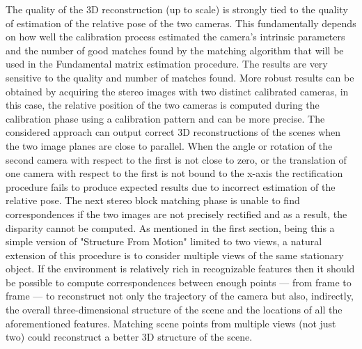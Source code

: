 \documentclass[12pt]{amsart}
\begin{document}
The quality of the 3D reconstruction (up to scale) is strongly tied to the quality of estimation of the relative pose of the two cameras.
This fundamentally depends on how well the calibration process estimated the camera's intrinsic parameters and the number of good matches found by the matching algorithm
that will be used in the Fundamental matrix estimation procedure. The results are very sensitive to the quality and number of matches found.
More robust results can be obtained by acquiring the stereo images with two distinct calibrated cameras, in this case, the relative position of the two cameras is
computed during the calibration phase using a calibration pattern and can be more precise.
The considered approach can output correct 3D reconstructions of the scenes when the two image planes are close to parallel. 
When the angle or rotation of the second camera with respect to the first is not close to zero,
or the translation of one camera with respect to the first is not bound to the x-axis the rectification procedure fails to produce expected results
due to incorrect estimation of the relative pose. The next stereo block matching phase is unable to find correspondences if the two
images are not precisely rectified and as a result, the disparity cannot be computed.
As mentioned in the first section, being this a simple version of "Structure From Motion" limited to two views, a natural extension of this procedure is to consider
multiple views of the same stationary object. If the environment is relatively rich in recognizable features then 
it should be possible to compute correspondences between enough points — from frame to frame — to reconstruct not only the trajectory of the camera but also, indirectly, 
the overall three-dimensional structure of the scene and the locations of all the aforementioned features. 
Matching scene points from multiple views (not just two) could reconstruct a better 3D structure of the scene.
\end{document}
